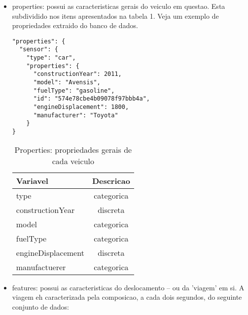 \documentclass[10pt, conference]{IEEEtran}
\begin{document}
\begin{itemize}

  \item properties: possui as caracteristicas gerais do veiculo em questao. Esta subdividido
  nos itens apresentados na tabela 1. Veja um exemplo de propriedades extraido do banco de dados.


\begin{lstlisting}
"properties": {
  "sensor": {
    "type": "car",
    "properties": {
      "constructionYear": 2011,
      "model": "Avensis",
      "fuelType": "gasoline",
      "id": "574e78cbe4b09078f97bbb4a",
      "engineDisplacement": 1800,
      "manufacturer": "Toyota"
    }
}
\end{lstlisting}



\begin{table}
\caption{Properties: propriedades gerais de cada veiculo}
\label{tab:perfs}
\centering
\begin{tabular}{l|c}
\multicolumn{1}{l|}{\bf Variavel} &
\multicolumn{1}{l}{\bf Descricao}  \\ \hline
type                & categorica       \\
constructionYear    & discreta           \\
model               & categorica         \\
fuelType            & categorica           \\
engineDisplacement  & discreta             \\
manufactuerer       & categorica       
\end{tabular}
\end{table}

  \item features: possui as caracteristicas do deslocamento -- ou da 'viagem' em si. A viagem
  eh caracterizada pela composicao, a cada dois segundos, do seguinte conjunto de dados:




\end{itemize}
\end{document}
